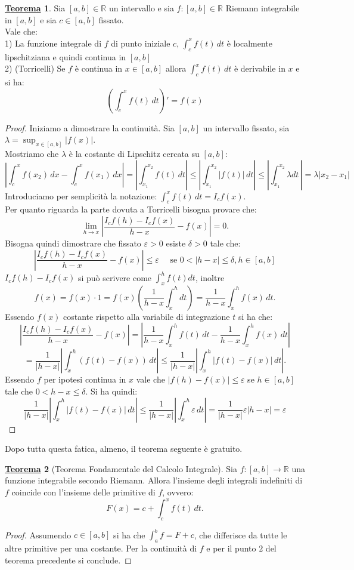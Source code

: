 \documentclass[a4paper,twoside]{article}
\renewcommand{\epsilon}{\varepsilon}
\newcommand{\R}{\mathbb{R}}
\theoremstyle{definition}
\newtheorem{theorem}{\color{Red}\underline{\textrm Teorema}}
\numberwithin{theorem}{section}
\begin{document}
\begin{theorem}
    Sia $[a,b]\in\R$ un intervallo e sia $f:[a,b]\in\R$ Riemann integrabile in $[a,b]$ e sia $c\in[a,b]$ fissato.\\ Vale che:\\
    1) La funzione integrale di $f$ di punto iniziale $c$, $\int_c^x f(t)\,dt$ è localmente lipschitziana e quindi continua in $[a,b]$ \\
    2) (Torricelli) Se $f$ è continua in $x\in[a,b]$ allora $\int_c^x f(t)\,dt$ è derivabile in $x$ e si ha: $$\left(\int_c^x f(t)\,dt\right)' =f(x)$$
\end{theorem}
\begin{proof}
    Iniziamo a dimostrare la continuità. Sia $[a,b]$ un intervallo fissato, sia $\lambda=\sup_{x\in[a,b]}|f(x)|$.\\ Mostriamo che $\lambda$ è la costante di Lipschitz cercata su $[a,b]$:
    $$\left|\int_c^xf(x_2)\,dx-\int_c^xf(x_1)\,dx\right|=\left|\int_{x_1}^{x_2}f(t)\,dt\right|\leq\left|\int_{x_1}^{x_2}|f(t)|\,dt\right|\leq\left|\int_{x_1}^{x_2}\lambda dt\,\right|=\lambda|x_2-x_1|$$
    Introduciamo per semplicità la notazione: $\int_c^xf(t)\,dt= I_c f(x).$ \\
    Per quanto riguarda la parte dovuta a Torricelli bisogna provare che: 
    $$\lim_{h\to x}\left|\frac{I_cf(h)-I_cf(x)}{h-x}-f(x)\right|=0.$$
    Bisogna quindi dimostrare che fissato $\epsilon>0$ esiste $\delta>0$ tale che:
    $$\left|\frac{I_cf(h)-I_cf(x)}{h-x}-f(x)\right|\leq\epsilon\quad \text{ se }  0<|h-x|\leq\delta, h\in[a,b]$$
    $I_cf(h)-I_cf(x)$ si può scrivere come $\int_x^hf(t)dt$, inoltre 
    $$f(x)=f(x)\cdot 1 = f(x)\left(\frac{1}{h-x}\int_x^h dt\right)=\frac{1}{h-x}\int_x^h f(x)\,dt.$$
    Essendo $f(x)$ costante rispetto alla variabile di integrazione $t$ si ha che:
    $$\left|\frac{I_cf(h)-I_cf(x)}{h-x}-f(x)\right|=\left|\frac{1}{h-x}\int_x^h f(t)\,dt -\frac{1}{h-x}\int_x^h f(x)\,dt\right|$$
    $$=\frac{1}{|h-x|}\left|\int_x^h(f(t)-f(x))\,dt\right|\leq\frac{1}{|h-x|}\left|\int_x^h|f(t)-f(x)|\,dt\right|.$$
    Essendo $f$ per ipotesi continua in $x$ vale che $|f(h)-f(x)|\leq\epsilon$ se $h\in[a,b]$ tale che $0<h-x\leq\delta$. Si ha quindi:
    $$\frac{1}{|h-x|}\left|\int_x^h|f(t)-f(x)|\,dt\right|\leq\frac{1}{|h-x|}\left|\int_x^h\epsilon\, dt\right|=\frac{1}{|h-x|}\epsilon|h-x|=\epsilon$$
\end{proof}
Dopo tutta questa fatica, almeno, il teorema seguente è gratuito.
\begin{theorem}[Teorema Fondamentale del Calcolo Integrale]
Sia $f:[a,b]\to\R$ una funzione integrabile secondo Riemann. Allora l'insieme degli integrali indefiniti di $f$ coincide con l'insieme delle primitive di $f$, ovvero: $$F(x)=c+\int_c^x f(t)\,dt.$$    
\end{theorem}
\begin{proof}
    Assumendo $c\in [a,b]$ si ha che $\int_{a}^{b}f = F + c$, che differisce da tutte le altre primitive per una costante. Per la continuità di $f$ e per il punto $2$ del teorema precedente si conclude.
\end{proof}
\end{document}
